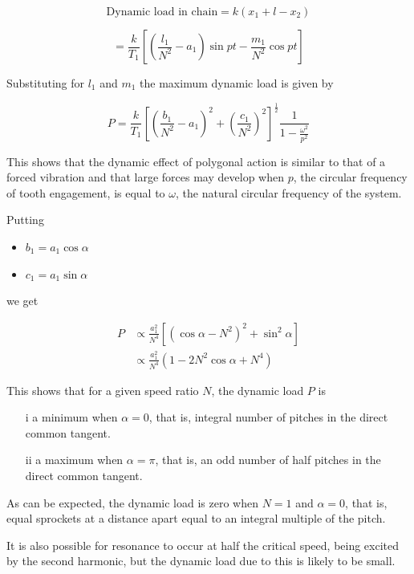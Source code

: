 \begin{equation}
\text{Dynamic load in chain} =k(x_1+l-x_2)
\end{equation}

\begin{equation}
=\frac{k}{T_1}\left[\left(\frac{l_1}{N^2}-a_1\right)\sin pt - \frac{m_1}{N^2}\cos pt\right]
\end{equation}

Substituting for $l_1$ and $m_1$ the maximum dynamic load is given by

\begin{equation}
  P=\frac{k}{T_1}\left[\left(\frac{b_1}{N^2}-a_1\right)^2+\left(\frac{c_1}{N^2}\right)^2\right]^\frac{1}{2} \frac{1}{1-\frac{\omega^2}{p^2}}
\end{equation}


This shows that the dynamic effect of polygonal action is similar to that of a forced vibration and that large forces may develop when $p$, the circular frequency of tooth engagement, is equal to $\omega$, the natural circular frequency of the system.

Putting

\begin{itemize}
\item $b_1=a_1\cos\alpha$
\item $c_1=a_1\sin\alpha$
\end{itemize}

we get

\begin{equation}
  \begin{split}
  P &\propto \frac{a_1^2}{N^4}\left[\left(\cos\alpha-N^2\right)^2 + \sin^2\alpha\right] \\
  &\propto \frac{a_1^2}{N^4}\left(1-2N^2\cos\alpha+N^4\right)
  \end{split}
\end{equation}

This shows that for a given speed ratio $N$, the dynamic load $P$ is

\begin{itemize}
\item[i] a minimum when $\alpha=0$, that is, integral number of pitches in the direct common tangent.
\item[ii] a maximum when $\alpha=\pi$, that is, an odd number of half pitches in the direct common tangent.
\end{itemize}

As can be expected, the dynamic load is zero when $N = 1$ and $\alpha = 0$, that is, equal sprockets at a distance apart equal to an integral multiple of the pitch.

It is also possible for resonance to occur at half the critical speed, being excited by the second harmonic, but the dynamic load due to this is likely to be small.
